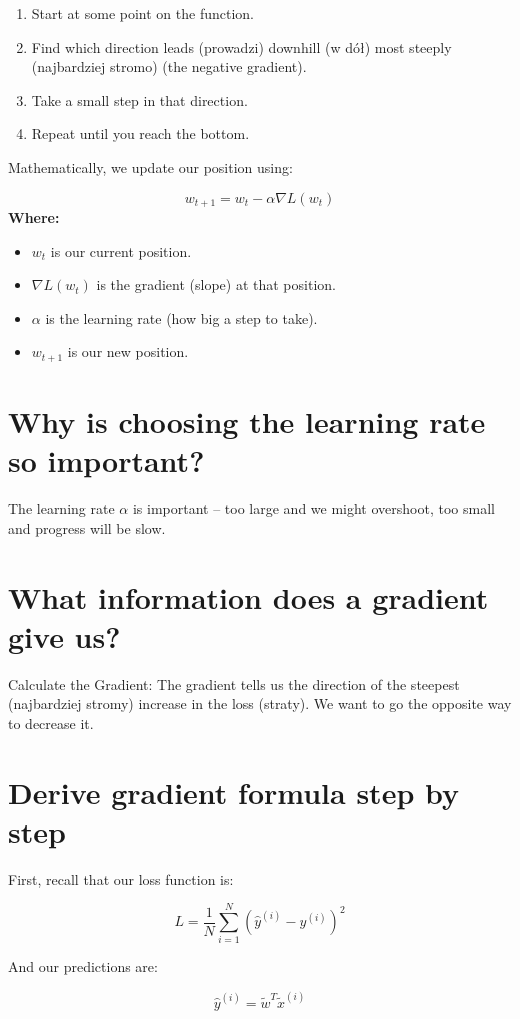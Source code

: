 \documentclass{article}
\begin{document}
\begin{enumerate}
    \item Start at some point on the function.
    \item Find which direction leads (prowadzi) downhill (w dół) most steeply (najbardziej stromo) (the negative gradient).
    \item Take a small step in that direction.
    \item Repeat until you reach the bottom.
\end{enumerate}

Mathematically, we update our position using:

\[
w_{t+1} = w_t - \alpha \nabla L(w_t)
\]
\newpage
\textbf{Where:}
\begin{itemize}
    \item \( w_t \) is our current position.
    \item \( \nabla L(w_t) \) is the gradient (slope) at that position.
    \item \( \alpha \) is the learning rate (how big a step to take).
    \item \( w_{t+1} \) is our new position.
\end{itemize}
\section{Why is choosing the learning rate so important?}
The learning rate \( \alpha \) is important -- too large and we might overshoot, too small and progress will be slow.
\section{What information does a gradient give us?}
Calculate the Gradient: The gradient tells us the direction of the steepest (najbardziej stromy) increase in the loss (straty). We want to go the opposite way to decrease it.

\section{ Derive gradient formula step by step}

First, recall that our loss function is:

\[
L = \frac{1}{N} \sum_{i=1}^{N} \left( \hat{y}^{(i)} - y^{(i)} \right)^2
\]

And our predictions are:

\[
\hat{y}^{(i)} = \tilde{w}^{T} \tilde{x}^{(i)}
\]
\end{document}
